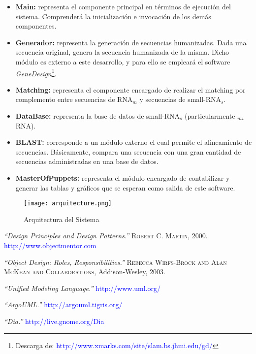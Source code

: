 \documentclass[12pt,a4paper,spanish]{article}
\begin{document}
\begin{itemize}
  \item \textbf{Main:} representa el componente principal en términos de ejecución del sistema. Comprenderá la  
  inicialización e invocación de los demás componentes.

  \item \textbf{Generador:} representa la generación de secuencias humanizadas. Dada una 		 
  secuencia original, genera la secuencia humanizada de la misma. Dicho módulo es externo a este desarrollo, y para ello  
  se empleará el software \emph{GeneDesign}\footnote{Descarga de: 
  \textcolor{blue}{http://www.xmarks.com/site/slam.bs.jhmi.edu/gd/}}.

  \item \textbf{Matching:} representa el componente encargado de realizar el matching por complemento entre secuencias
  de RNA$_m$ y secuencias de small-RNA$_s$.  

  \item \textbf{DataBase:} representa la base de datos de small-RNA$_s$ (particularmente $_m$$_i$RNA).

  \item \textbf{BLAST:} corresponde a un módulo externo el cual permite el alineamiento de secuencias. Básicamente, 	 
  compara una secuencia con una gran cantidad de secuencias administradas en una base de datos. 

  \item \textbf{MasterOfPuppets:} representa el módulo encargado de contabilizar y generar las tablas y gráficos que se  
  esperan como salida de este software. 
\end{itemize}


\begin{figure}[!hbtp]
	\begin{center}
		\texttt{[image: arquitecture.png]}
		\caption{Arquitectura del Sistema}
		\label{arquitecture}
	\end{center}
\end{figure}





\begin{thebibliography}{99}
\small  {} {\em{“Design Principles and Design Patterns.”}} 
		\textsc{Robert C. Martin}, 2000. \textcolor{blue}{http://www.objectmentor.com}
  
\small  {} {\em{“Object Design: Roles, Responsibilities.”}} 
		\textsc{Rebecca Wirfs-Brock and Alan McKean and Collaborations}, Addison-Wesley, 2003.  

\small  {} {\em{“Unified Modeling Language.”}} \textcolor{blue}{http://www.uml.org/}

\small  {} {\em{“ArgoUML.”}} \textcolor{blue}{http://argouml.tigris.org/}

\small {} {\em{“Dia.”}} \textcolor{blue}{http://live.gnome.org/Dia}
\end{thebibliography}
\end{document}
